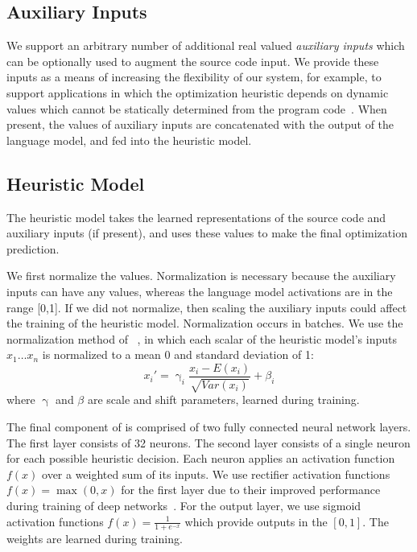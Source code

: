 \subsection{Auxiliary Inputs}

We support an arbitrary number of additional real valued \emph{auxiliary inputs} which can be optionally used to augment the source code input. We provide these inputs as a means of increasing the flexibility of our system, for example, to support applications in which the optimization heuristic depends on dynamic values which cannot be statically determined from the program code~\cite{Ding2015,Stephenson2005}. When present, the values of auxiliary inputs are concatenated with the output of the language model, and fed into the heuristic model.


\subsection{Heuristic Model}

The heuristic model takes the learned representations of the source code and auxiliary inputs (if present), and uses these values to make the final optimization prediction.

We first normalize the values. Normalization is necessary because the auxiliary inputs can have any values, whereas the language model activations are in the range [0,1]. If we did not normalize, then scaling the auxiliary inputs could affect the training of the heuristic model. Normalization occurs in batches. We use the normalization method of ~\cite{Ioffe2015a}, in which each scalar of the heuristic model's inputs $x_1 \ldots x_n$ is normalized to a mean 0 and standard deviation of 1:
%
\[ x_i' = \upgamma_i \frac{x_i - E(x_i)}{\sqrt{Var(x_i)}} + \beta_i \]
%
where $\upgamma$ and $\beta$ are scale and shift parameters, learned during training.

The final component of \DeepTune is comprised of two fully connected neural network layers. The first layer consists of 32 neurons. The second layer consists of a single neuron for each possible heuristic decision. Each neuron applies an activation function $f(x)$ over a weighted sum of its inputs. We use rectifier activation functions $f(x) = \max(0, x)$ for the first layer due to their improved performance during training of deep networks~\cite{Nair2010}. For the output layer, we use sigmoid activation functions $f(x) = \frac{1}{1+e^{-x}}$ which provide outputs in the $[0,1]$. The weights are learned during training.

